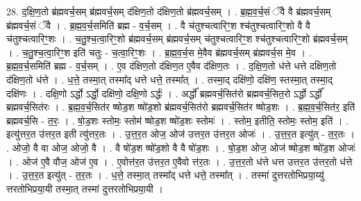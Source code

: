 \documentclass[17pt]{extarticle}
\begin{document}
28. द॒क्षि॒ण॒तो ब्र॑ह्मवर्च॒सम् ब्र॑ह्मवर्च॒सम् द॑क्षिण॒तो द॑क्षिण॒तो ब्र॑ह्मवर्च॒सम् । . ब्र॒ह्म॒व॒र्च॒सं ॅवै वै ब्र॑ह्मवर्च॒सम् ब्र॑ह्मवर्च॒सं ॅवै । . ब्र॒ह्म॒व॒र्च॒समिति॑ ब्रह्म - व॒र्च॒सम् । . वै च॑तुश्चत्वारिꣳ॒॒श श्च॑तुश्चत्वारिꣳ॒॒शो वै वै च॑तुश्चत्वारिꣳ॒॒शः । . च॒तु॒श्च॒त्वा॒रिꣳ॒॒शो ब्र॑ह्मवर्च॒सम् ब्र॑ह्मवर्च॒सम् च॑तुश्चत्वारिꣳ॒॒श श्च॑तुश्चत्वारिꣳ॒॒शो ब्र॑ह्मवर्च॒सम् । . च॒तु॒श्च॒त्वा॒रिꣳ॒॒श इति॑ चतुः - च॒त्वा॒रिꣳ॒॒शः । . ब्र॒ह्म॒व॒र्च॒स मे॒वैव ब्र॑ह्मवर्च॒सम् ब्र॑ह्मवर्च॒स मे॒व । . ब्र॒ह्म॒व॒र्च॒समिति॑ ब्रह्म - व॒र्च॒सम् । . ए॒व द॑क्षिण॒तो द॑क्षिण॒त ए॒वैव द॑क्षिण॒तः । . द॒क्षि॒ण॒तो ध॑त्ते धत्ते दक्षिण॒तो द॑क्षिण॒तो ध॑त्ते । . ध॒त्ते॒ तस्मा॒त् तस्मा᳚द् धत्ते धत्ते॒ तस्मा᳚त् । . तस्मा॒द् दक्षि॑णो॒ दक्षि॑ण॒ स्तस्मा॒त् तस्मा॒द् दक्षि॑णः । . दक्षि॒णो ऽर्द्धो ऽर्द्धो॒ दक्षि॑णो॒ दक्षि॒णो ऽर्द्धः॑ । . अर्द्धो᳚ ब्रह्मवर्च॒सित॑रो ब्रह्मवर्च॒सित॒रो ऽर्द्धो ऽर्द्धो᳚ ब्रह्मवर्च॒सित॑रः । . ब्र॒ह्म॒व॒र्च॒सित॑र ष्षोड॒श ष्षो॑ड॒शो ब्र॑ह्मवर्च॒सित॑रो ब्रह्मवर्च॒सित॑र ष्षोड॒शः । . ब्र॒ह्म॒व॒र्च॒सित॑र॒ इति॑ ब्रह्मवर्च॒सि - त॒रः॒ । . षो॒ड॒शः स्तोमः॒ स्तोम॑ ष्षोड॒श ष्षो॑ड॒शः स्तोमः॑ । . स्तोम॒ इतीति॒ स्तोमः॒ स्तोम॒ इति॑ । . इत्यु॑त्तर॒त उ॑त्तर॒त इती त्यु॑त्तर॒तः । . उ॒त्त॒र॒त ओज॒ ओज॑ उत्तर॒त उ॑त्तर॒त ओजः॑ । . उ॒त्त॒र॒त इत्यु॑त् - त॒र॒तः । . ओजो॒ वै वा ओज॒ ओजो॒ वै । . वै षो॑ड॒श ष्षो॑ड॒शो वै वै षो॑ड॒शः । . षो॒ड॒श ओज॒ ओज॑ ष्षोड॒श ष्षो॑ड॒श ओजः॑ । . ओज॑ ए॒वै वौज॒ ओज॑ ए॒व । . ए॒वोत्त॑र॒त उ॑त्तर॒त ए॒वैवो त्त॑र॒तः । . उ॒त्त॒र॒तो ध॑त्ते धत्त उत्तर॒त उ॑त्तर॒तो ध॑त्ते । . उ॒त्त॒र॒त इत्यु॑त् - त॒र॒तः । . ध॒त्ते॒ तस्मा॒त् तस्मा᳚द् धत्ते धत्ते॒ तस्मा᳚त् । . तस्मा॑ दुत्तरतोभिप्रया॒य्यु॑ त्तरतोभिप्रया॒यी तस्मा॒त् तस्मा॑ दुत्तरतोभिप्रया॒यी । \newline
\end{document}
